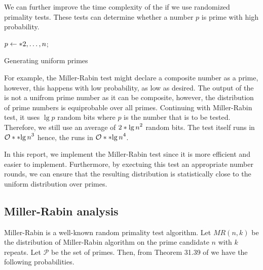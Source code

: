 We can further improve the time complexity of the  if we use randomized primality tests. These tests can determine whether a number \(p\) is prime with high probability. 
\begin{algorithm}
	\DontPrintSemicolon
    {
        \(p \gets \set{2,\dots, n}\);
    }
	\caption{Generating uniform primes}
    \label{alg:trivialRPNG}
\end{algorithm}

For example, the Miller-Rabin test might declare a composite number as a prime, however, this happens with low probability, as low as desired. The output of the  is not a unifrom prime number as it can be composite, however, the distribution of prime numbers is equiprobable over all primes. Continuing with Miller-Rabin test, it uses \(\lg p\) random bits where \(p\) is the number that is to be tested. Therefore, we still use an average of \(2\bracket{\lg n}^2\) random bits. The test itself runs in \(\bigO{\bracket{\lg n}^3}\) hence, the  runs in \(\bigO{\bracket{\lg n}^4}\).

In this report, we implement the Miller-Rabin test since it is more efficient and easier to implement. Furthermore, by exectuing this test an appropriate number rounds, we can ensure that the resulting distribution is statistically close to the uniform distribution over primes.

\subsection{Miller-Rabin analysis}
Miller-Rabin is a well-known random primality test algorithm. Let \(MR(n,k)\) be the distribution of Miller-Rabin algorithm on the prime candidate \(n\) with \(k\) repeats. Let \(\mathcal{P}\) be the set of primes. Then, from Theorem 31.39 of \cite{clrs} we have the following probabilities.

